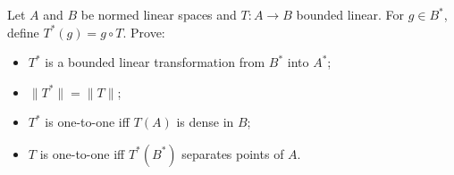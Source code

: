 Let $A$ and $B$ be normed linear spaces and $T: A \to B$ bounded linear. For $g \in B^*$, define $T^*(g) = g \circ T$. Prove:
\begin{itemize}
\item[(a)] $T^*$ is a bounded linear transformation from $B^*$ into $A^*$;
\item[(b)] $\|T^*\| = \|T\|$;
\item[(c)] $T^*$ is one-to-one iff $T(A)$ is dense in $B$;
\item[(d)] $T$ is one-to-one iff $T^*(B^*)$ separates points of $A$.
\end{itemize}
